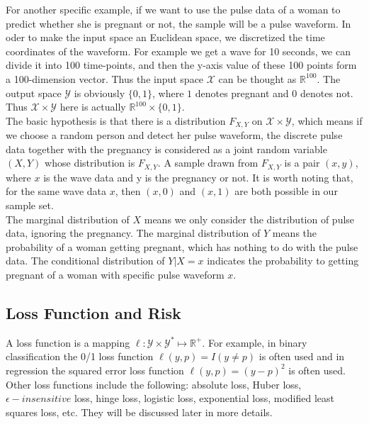 \begin{example}
	\noindent For another specific example, if we want to use the pulse data of a woman to predict whether she is pregnant or not, the sample will be a pulse waveform. In oder to make the input space an Euclidean space, we discretized the time coordinates of the waveform. For example we get a wave for 10 seconds, we can divide it into 100 time-points, and then the y-axis value of these 100 points form a 100-dimension vector. Thus the input space $\mathcal{X}$ can be thought as $\mathbb{R}^{100}$. The output space $\mathcal{Y}$ is obviously $\{0,1\}$, where $1$ denotes pregnant and $0$ denotes not. Thus $\mathcal{X}\times\mathcal{Y}$ here is actually $\mathbb{R}^{100} \times \{0,1\}$. \\
	
	\noindent The basic hypothesis is that there is a distribution $F_{X,Y}$ on $\mathcal{X}\times\mathcal{Y}$,	 which means if we choose a random person and detect her pulse waveform, the discrete pulse data together with the pregnancy is considered as a joint random variable $(X,Y)$ whose distribution is $F_{X,Y}$. A sample drawn from $F_{X,Y}$ is a pair $(x,y)$, where $x$ is the wave data and y is the pregnancy or not. It is worth noting that, for the same wave data $x$, then $(x,0)$ and $(x,1)$ are both possible in our sample set. \\
	The marginal distribution of $X$ means we only consider the distribution of pulse data, ignoring the pregnancy. The marginal distribution of $Y$ means the probability of a woman getting pregnant, which has nothing to do with the pulse data. The conditional distribution of $Y|X=x$ indicates the probability to getting pregnant of a woman with specific pulse waveform $x$.
\end{example}

\subsection{Loss Function and Risk}
A loss function is a mapping $\ell:\mathcal{Y} \times \mathcal{Y}^* \mapsto \mathbb{R}^+$. For example, in binary classification the 0/1 loss function $\ell(y,p) = I(y\ne p)$ is often used and in regression the squared error loss function $\ell(y,p)=(y-p)^2$ is often used. Other loss functions include the following: absolute loss, Huber loss, $\epsilon-insensitive$ loss, hinge loss, logistic loss, exponential loss, modified least squares loss, etc. They will be discussed later in more details.

